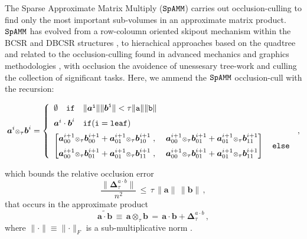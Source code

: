 \documentclass[letterpaper,twocolumn,amsmath,amsfont,amssymb,english,aps,jcp,preprintnumbers,groupaddress,nofootinbib,tightenlines,floatfix]{revtex4}
\newcommand{\mat}[1]{\boldsymbol{#1}}
\newcommand{\ot}{  {\scriptstyle \otimes}_{ \tau } }
\theoremstyle{plain}
\theoremstyle{remark}
\theoremstyle{plain}
\begin{document}
The Sparse Approximate Matrix Multiply ($\tt SpAMM$) carries out occlusion-culling to find only the
most important sub-volumes in an approximate matrix product. 
$\tt SpAMM$ has evolved from a row-coloumn oriented skipout mechanism within the
BCSR and DBCSR structures \cite{}, to hierachical approaches based on the quadtree and related to 
the occlusion-culling found in advanced mechanics and graphics methodologies \cite{}, 
with occlusion the avoidence of unessesary tree-work and culling the collection of significant tasks. 
Here, we ammend the $\tt SpAMM$ occlusion-cull with the recursion:
\begin{widetext}
\begin{equation}
\mat{a}^{i} \ot \mat{b}^{i} =
\left\{
        \begin{array}{ll}
                 \emptyset \quad \tt{if}\quad \lVert \mat{a}^i \rVert \lVert \mat{b}^i \rVert < \tau \lVert a \rVert \lVert b \rVert \\[0.2cm]
                 \mat{a} ^i \cdot \mat{b}^i \quad  \tt{if}(i=\tt{leaf}) \\[0.2cm]
\begin{bmatrix} \mat{a}^{i+1}_{00} \ot \mat{b}^{i+1}_{00} +\mat{a}^{i+1}_{01} \ot \mat{b}^{i+1}_{10} \; , \; &
                \mat{a}^{i+1}_{00} \ot \mat{b}^{i+1}_{01} +\mat{a}^{i+1}_{01} \ot \mat{b}^{i+1}_{11}  \\[0.2cm]
                \mat{a}^{i+1}_{00} \ot \mat{b}^{i+1}_{01} +\mat{a}^{i+1}_{01} \ot \mat{b}^{i+1}_{11} \; , \; &
                \mat{a}^{i+1}_{00} \ot \mat{b}^{i+1}_{01} +\mat{a}^{i+1}_{01} \ot \mat{b}^{i+1}_{11}
\end{bmatrix}  \quad \tt{else}
                \end{array}
              \right.  \, ,
\end{equation}
\end{widetext}
which bounds the relative occlusion error
\begin{equation}\label{bound}
\frac{\lVert \mat{\Delta}^{a \cdot b}_{\tau} \rVert}{n^2 }  \, \leq \, \tau \, \lVert \mat{a} \rVert  \,  \lVert \mat{b} \rVert \, ,
\end{equation}
that occurs in the approximate product
\begin{equation}
\widetilde{\mat{a}\cdot \mat{b}} \,  \equiv \, \mat{a} \ot \mat{b} \,
  = \, \mat{a} \cdot \mat{b} + \mat{\Delta}^{a \cdot b}_{\tau} \, ,
\end{equation}
where $\lVert \cdot \rVert \equiv \lVert \cdot \rVert_F$ is a sub-multiplicative norm \cite{}.
\end{document}
